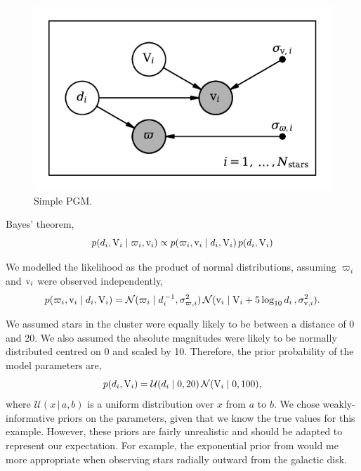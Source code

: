 \begin{figure}[tb]
    \centering
    \includegraphics{figures/simple-pgm.pdf}
    \caption{Simple PGM.}
\end{figure}

Bayes' theorem,
%
\begin{equation}
    p(d_i, \mathrm{V}_i \mid \varpi_i, \mathrm{v}_i) \propto p(\varpi_i, \mathrm{v}_i \mid d_i, \mathrm{V}_i) \, p(d_i, \mathrm{V}_i)
\end{equation}
%

We modelled the likelihood as the product of normal distributions, assuming \(\varpi_i\) and \(\mathrm{v}_i\) were observed independently,
%
\begin{equation}
    p(\varpi_i, \mathrm{v}_i \mid d_i, \mathrm{V}_i) = \mathcal{N}(\varpi_i \mid d_i^{\,-1}, \sigma_{\varpi, i}^2) \, \mathcal{N}(\mathrm{v}_i \mid \mathrm{V}_i + 5\log_{10}d_i \, , \sigma_{\mathrm{v}, i}^2).\label{eq:hbm-like}
\end{equation}
%

We assumed stars in the cluster were equally likely to be between a distance of 0 and 20. We also assumed the absolute magnitudes were likely to be normally distributed centred on 0 and scaled by 10. Therefore, the prior probability of the model parameters are,
%
\begin{equation}
    p(d_i, \mathrm{V}_i) = \mathcal{U}(d_i \mid 0, 20) \, \mathcal{N}(\mathrm{V}_i \mid 0, 100),
\end{equation}
%
where \(\mathcal{U}(x \,|\, a, b)\) is a uniform distribution over \(x\) from \(a\) to \(b\). We chose weakly-informative priors on the parameters, given that we know the true values for this example. However, these priors are fairly unrealistic and should be adapted to represent our expectation. For example, the exponential prior from \citet{Bailer-Jones.Rybizki.ea2018} would me more appropriate when observing stars radially outward from the galactic disk.

